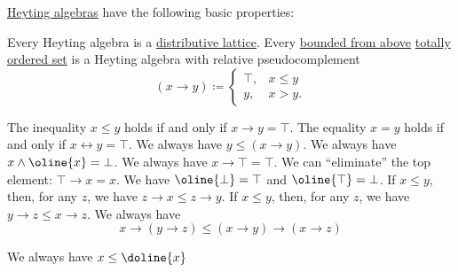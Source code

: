 \begin{proposition}\label{thm:def:heyting_algebra}
  \hyperref[def:heyting_algebra]{Heyting algebras} have the following basic properties:
  \begin{thmenum}
     Every Heyting algebra is a \hyperref[def:distributive_lattice]{distributive lattice}.
     Every \hyperref[def:extremal_points/bounds]{bounded from above} \hyperref[def:totally_ordered_set]{totally ordered set} is a Heyting algebra with relative pseudocomplement
    \begin{equation}\label{eq:thm:def:heyting_algebra/totally}
      (x \rightarrow y) \coloneqq \begin{cases}
        \top, &x \leq y \\
        y,    &x > y.
      \end{cases}
    \end{equation}

     The inequality \( x \leq y \) holds if and only if \( x \rightarrow y = \top \).
     The equality \( x = y \) holds if and only if \( x \leftrightarrow y = \top \).
     We always have \( y \leq (x \rightarrow y) \).
     We always have \( x \wedge \oline{x} = \bot \).
     We always have \( x \rightarrow \top = \top \).
     We can \enquote{eliminate} the top element: \( \top \rightarrow x = x \).
     We have \( \oline{\bot} = \top \) and \( \oline{\top} = \bot \).
     If \( x \leq y \), then, for any \( z \), we have \( z \rightarrow x \leq z \rightarrow y \).
     If \( x \leq y \), then, for any \( z \), we have \( y \rightarrow z \leq x \rightarrow z \).
     We always have
    \begin{equation}\label{eq:thm:def:heyting_algebra/dist}
      x \rightarrow (y \rightarrow z) \leq (x \rightarrow y) \rightarrow (x \rightarrow z)
    \end{equation}

     We always have \( x \leq \doline{x} \)
  \end{thmenum}
\end{proposition}
